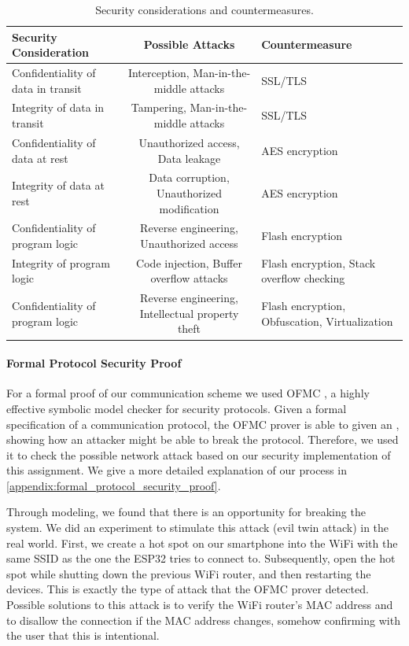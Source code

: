 \documentclass[conference]{IEEEtran}
\begin{document}
\begin{table}[h]
\centering
\begin{adjustbox}{width=\columnwidth,center}
\begin{tabular}{|l|c||l|}
\hline
\textbf{Security Consideration} & \textbf{Possible Attacks} & \textbf{Countermeasure} \\ \hline
Confidentiality of data in transit & Interception, Man-in-the-middle attacks          & SSL/TLS \\ \hline
Integrity of data in transit       & Tampering, Man-in-the-middle attacks             & SSL/TLS \\ \hline
Confidentiality of data at rest    & Unauthorized access, Data leakage                & AES encryption \\ \hline
Integrity of data at rest          & Data corruption, Unauthorized modification       & AES encryption \\ \hline
Confidentiality of program logic   & Reverse engineering, Unauthorized access         & Flash encryption \\ \hline
Integrity of program logic         & Code injection, Buffer overflow attacks          & Flash encryption, Stack overflow checking \\ \hline
Confidentiality of program logic   & Reverse engineering, Intellectual property theft & Flash encryption, Obfuscation, Virtualization \\ \hline
\end{tabular}
\end{adjustbox}
\caption{Security considerations and countermeasures.}
\label{tab:security_considerations}
\end{table}

\paragraph{Formal Protocol Security Proof}
For a formal proof of our communication scheme we used
OFMC \cite{basin2005ofmc}, a highly effective symbolic model checker for security protocols.
Given a formal specification of a communication protocol, the OFMC prover is able to given an , showing how an attacker might be able to break the protocol.
Therefore, we used it to check the possible network attack based on our security implementation of this assignment.
We give a more detailed explanation of our process in \cref{appendix:formal_protocol_security_proof}.

Through modeling, we found that there is an opportunity for breaking the system.
We did an experiment to stimulate this attack (evil twin attack) in the real world.
First, we create a hot spot on our smartphone into the WiFi with the same SSID as the one the ESP32 tries to connect to.
Subsequently, open the hot spot while shutting down the previous WiFi router, and then restarting the devices.
This is exactly the type of attack that the OFMC prover detected.
Possible solutions to this attack is to verify the WiFi router's MAC address and to disallow the connection if the MAC address changes, somehow confirming with the user that this is intentional.
     
\end{document}
